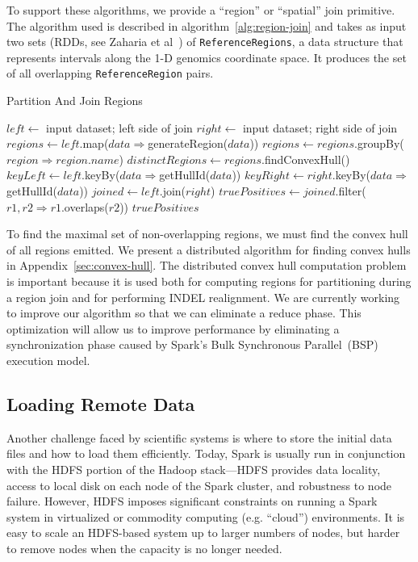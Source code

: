 \documentclass{acm_proc_article-sp}
\begin{document}
To support these algorithms, we provide a ``region'' or ``spatial'' join primitive. The algorithm used is described
in algorithm~\ref{alg:region-join} and takes as input two sets (RDDs, see Zaharia et al~\cite{zaharia12}) of
\texttt{ReferenceRegions}, a data structure that represents intervals along the 1-D genomics coordinate
space. It produces the set of all overlapping \texttt{ReferenceRegion} pairs.

\begin{algorithm}
\caption{Partition And Join Regions}
\label{alg:region-join}
\begin{algorithmic}
\STATE $left \leftarrow$ input dataset; left side of join
\STATE $right \leftarrow$ input dataset; right side of join
\STATE $regions \leftarrow left$.map($data \Rightarrow $generateRegion($data$))
\STATE $regions \leftarrow regions$.groupBy($region \Rightarrow region$.$name$)
\STATE $distinctRegions \leftarrow regions$.findConvexHull()
\STATE $keyLeft \leftarrow left$.keyBy($data \Rightarrow $getHullId($data$))
\STATE $keyRight \leftarrow right$.keyBy($data \Rightarrow $getHullId($data$))
\STATE $joined \leftarrow left$.join($right$)
\STATE $truePositives \leftarrow joined$.filter($r1, r2 \Rightarrow r1$.overlaps($r2$))
\RETURN $truePositives$
\end{algorithmic}
\end{algorithm}

To find the maximal set of non-overlapping regions, we must find the convex hull of all regions emitted.
We present a distributed algorithm for finding convex hulls in Appendix~\ref{sec:convex-hull}. The
distributed convex hull computation problem is important because it is used both for computing regions
for partitioning during a region join and for performing INDEL realignment. We are currently working to
improve our algorithm so that we can eliminate a reduce phase. This optimization will allow us to improve
performance by eliminating a synchronization phase caused by Spark's Bulk Synchronous
Parallel~(BSP) execution model.

\subsection{Loading Remote Data}
\label{sec:loading-remote-data}

Another challenge faced by scientific systems is where to store the initial data files and how to load them
efficiently. Today, Spark is usually run in conjunction with the HDFS portion of the Hadoop stack---HDFS
provides data locality, access to local disk on each node of the Spark cluster, and robustness to node
failure. However, HDFS imposes significant constraints on running a Spark system in virtualized or
commodity computing (e.g. ``cloud'') environments.  It is easy to scale an HDFS-based system up to
larger numbers of nodes, but harder to remove nodes when the capacity is no longer needed.  
\end{document}
